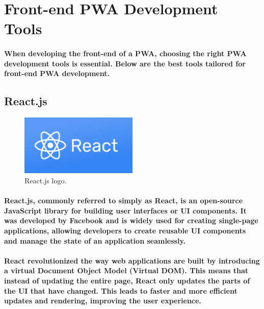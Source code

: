 \documentclass[12pt,a4paper]{article}
\begin{document}
	
	
	\section{Front-end PWA Development Tools}

    \paragraph{When developing the front-end of a PWA, choosing the right PWA development tools is essential. Below are the best tools tailored for front-end PWA development.}
    
    \subsection{React.js}

    \begin{figure}[h!]
      \centering
      \includegraphics[width=0.5\textwidth]{react.png}
      \caption{React.js logo.}
    \end{figure}

    \paragraph{React.js, commonly referred to simply as React, is an open-source JavaScript library for building user interfaces or UI components. It was developed by Facebook and is widely used for creating single-page applications, allowing developers to create reusable UI components and manage the state of an application seamlessly.}

    \paragraph{React revolutionized the way web applications are built by introducing a virtual Document Object Model (Virtual DOM). This means that instead of updating the entire page, React only updates the parts of the UI that have changed. This leads to faster and more efficient updates and rendering, improving the user experience.}
\end{document}

